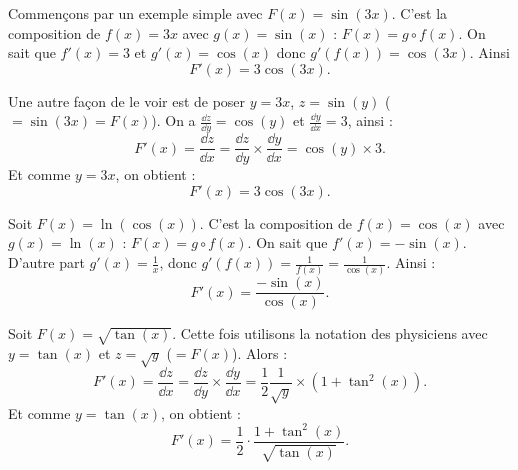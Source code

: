 \documentclass[11pt,class=report,crop=false]{standalone}
\begin{document}
\begin{exemple}
Commençons par un exemple simple avec $F(x) = \sin(3x)$. C'est la composition de $f(x) = 3x$ avec $g(x) = \sin(x)$ : $F(x) = g \circ f(x)$.
On sait que $f'(x) = 3$ et $g'(x) = \cos(x)$ donc $g'(f(x)) = \cos(3x)$.
Ainsi 
$$F'(x) = 3\cos(3x).$$

Une autre façon de le voir est de poser $y = 3x$, $z = \sin(y)$ ($= \sin(3x) = F(x)$).
On a $\frac{\dd z}{\dd y} = \cos(y)$ et $\frac{\dd y}{\dd x} = 3$, ainsi :
$$F'(x) =  \frac{\dd z}{\dd x}  
= \frac{\dd z}{\dd y} \times \frac{\dd y}{\dd x}
= \cos(y) \times 3.$$
Et comme $y = 3x$, on obtient :
$$F'(x) = 3\cos(3x).$$
\end{exemple}

\begin{exemple}
Soit $F(x) = \ln(\cos(x))$. C'est la composition de $f(x) = \cos(x)$ avec $g(x) = \ln(x)$ : $F(x) = g \circ f(x)$.
On sait que $f'(x) = - \sin(x)$. D'autre part $g'(x) = \frac1x$, donc $g'(f(x)) = \frac{1}{f(x)}= \frac{1}{\cos(x)}$.
Ainsi :
$$F'(x) = \frac{-\sin(x)}{\cos(x)}.$$
\end{exemple}

\begin{exemple}
Soit $F(x) = \sqrt{\tan(x)}$. Cette fois utilisons la notation des physiciens avec  $y= \tan(x)$ et $z = \sqrt{y}$ ($= F(x)$).
Alors :
$$F'(x) =  \frac{\dd z}{\dd x}  
= \frac{\dd z}{\dd y} \times \frac{\dd y}{\dd x}
= \frac12\frac{1}{\sqrt{y}} \times (1+\tan^2(x)).$$
Et comme $y = \tan(x)$, on obtient :
$$F'(x) = \frac12 \cdot \frac{1+\tan^2(x)}{\sqrt{\tan(x)}}.$$
\end{exemple}

\bigskip
\end{document}
